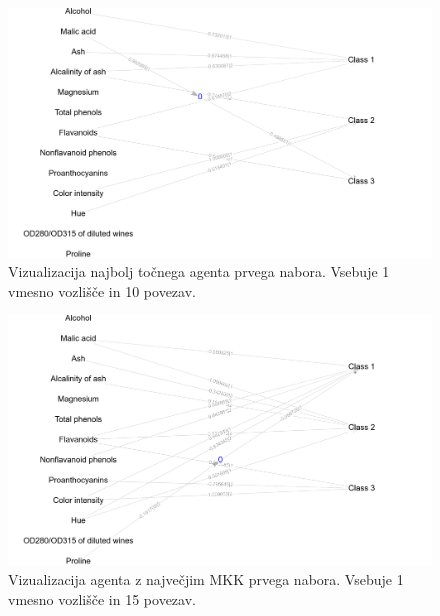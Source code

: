 \begin{figure}[H]
    \begin{center}
        \includegraphics[width=13cm]{wine/1/acc_g}
    \end{center}
    \caption{Vizualizacija najbolj točnega agenta prvega nabora. Vsebuje 1 vmesno vozlišče in 10 povezav.}
    \label{fig:wine_acc_1_g}
\end{figure}

\begin{figure}[H]
    \begin{center}
        \includegraphics[width=13cm]{wine/1/mcc_g}
    \end{center}
    \caption{Vizualizacija agenta z največjim MKK prvega nabora. Vsebuje 1 vmesno vozlišče in 15 povezav.}
    \label{fig:wine_mcc_1_g}
\end{figure}

\newpage

